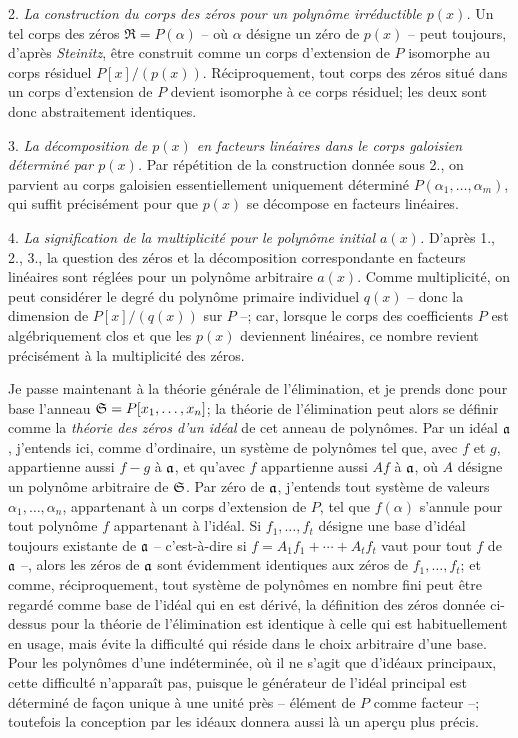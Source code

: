 2. \emph{La construction du corps des zéros pour un polynôme irréductible $p(x)$.} Un tel corps des zéros $\mathfrak R=P(\alpha)$ -- où $\alpha$ désigne un zéro de $p(x)$ -- peut toujours, d'après \emph{Steinitz}, être construit comme un corps d'extension de $P$ isomorphe au corps résiduel $P[x]/(p(x))$. Réciproquement, tout corps des zéros situé dans un corps d'extension de $P$ devient isomorphe à ce corps résiduel; les deux sont donc abstraitement identiques.

3. \emph{La décomposition de $p(x)$ en facteurs linéaires dans le corps galoisien déterminé par $p(x)$.} Par répétition de la construction donnée sous 2., on parvient au corps galoisien essentiellement uniquement déterminé $P(\alpha_1,\ldots,\alpha_m)$, qui suffit précisément pour que $p(x)$ se décompose en facteurs linéaires.

4. \emph{La signification de la multiplicité pour le polynôme initial $a(x)$.} D'après 1., 2., 3., la question des zéros et la décomposition correspondante en facteurs linéaires sont réglées pour un polynôme arbitraire $a(x)$. Comme multiplicité, on peut considérer le degré du polynôme primaire individuel $q(x)$ -- donc la dimension de $P[x]/(q(x))$ sur $P$ --; car, lorsque le corps des coefficients $P$ est algébriquement clos et que les $p(x)$ deviennent linéaires, ce nombre revient précisément à la multiplicité des zéros.

Je passe maintenant à la théorie générale de l'élimination, et je prends donc pour base l'anneau $\mathfrak S=P[x_1,\ldots,x_n]$; la théorie de l'élimination peut alors se définir comme la \emph{théorie des zéros d'un idéal} de cet anneau de polynômes. Par un idéal $\mathfrak a$, j'entends ici, comme d'ordinaire, un système de polynômes tel que, avec $f$ et $g$, appartienne aussi $f-g$ à $\mathfrak a$, et qu'avec $f$ appartienne aussi $Af$ à $\mathfrak a$, où $A$ désigne un polynôme arbitraire de $\mathfrak S$. Par zéro de $\mathfrak a$, j'entends tout système de valeurs $\alpha_1,\ldots,\alpha_n$, appartenant à un corps d'extension de $P$, tel que $f(\alpha)$ s'annule pour tout polynôme $f$ appartenant à l'idéal. Si $f_1,\ldots,f_t$ désigne une base d'idéal toujours existante de $\mathfrak a$ -- c'est-à-dire si $f=A_1f_1+\cdots+A_tf_t$ vaut pour tout $f$ de $\mathfrak a$ --, alors les zéros de $\mathfrak a$ sont évidemment identiques aux zéros de $f_1,\ldots,f_t$; et comme, réciproquement, tout système de polynômes en nombre fini peut être regardé comme base de l'idéal qui en est dérivé, la définition des zéros donnée ci-dessus pour la théorie de l'élimination est identique à celle qui est habituellement en usage, mais évite la difficulté qui réside dans le choix arbitraire d'une base. Pour les polynômes d'une indéterminée, où il ne s'agit que d'idéaux principaux, cette difficulté n'apparaît pas, puisque le générateur de l'idéal principal est déterminé de façon unique à une unité près -- élément de $P$ comme facteur --; toutefois la conception par les idéaux donnera aussi là un aperçu plus précis.

